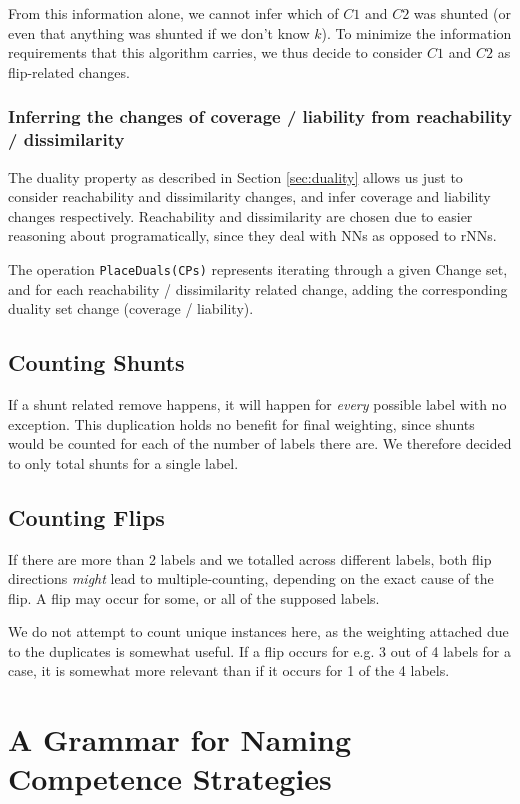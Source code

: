 \documentclass[a4paper,11pt]{report}
\begin{document}
From this information alone, we cannot infer which of $C1$ and $C2$ was shunted (or even that anything was shunted if we don't know $k$). To minimize the information requirements that this algorithm carries, we thus decide to consider $C1$ and $C2$ as flip-related changes.

\subsubsection{Inferring the changes of coverage / liability from reachability / dissimilarity}
The duality property as described in Section \ref{sec:duality} allows us just to consider reachability and dissimilarity changes, and infer coverage and liability changes respectively. Reachability and dissimilarity are chosen due to easier reasoning about programatically, since they deal with NNs as opposed to rNNs.

The operation \verb!PlaceDuals(CPs)! represents iterating through a given Change set, and for each reachability / dissimilarity related change, adding the corresponding duality set change (coverage / liability).

\subsection{Counting Shunts}
If a shunt related remove happens, it will happen for \emph{every} possible label with no exception. This duplication holds no benefit for final weighting, since shunts would be counted for each of the number of labels there are. We therefore decided to only total shunts for a single label.

\subsection{Counting Flips}
If there are more than 2 labels and we totalled across different labels, both flip directions \emph{might} lead to multiple-counting, depending on the exact cause of the flip. A flip may occur for some, or all of the supposed labels.

We do not attempt to count unique instances here, as the weighting attached due to the duplicates is somewhat useful. If a flip occurs for e.g. 3 out of 4 labels for a case, it is somewhat more relevant than if it occurs for 1 of the 4 labels.


\section{A Grammar for Naming Competence Strategies}
\end{document}
